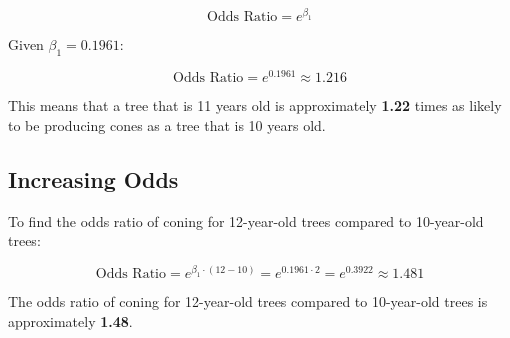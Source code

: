 \documentclass{article}
\begin{document}
\[
\text{Odds Ratio} = e^{\beta_1}
\]

Given \(\beta_1 = 0.1961\):

\[
\text{Odds Ratio} = e^{0.1961} \approx 1.216
\]

This means that a tree that is 11 years old is approximately \textbf{1.22} times as likely to be producing cones as a tree that is 10 years old.

\subsection{Increasing Odds}

To find the odds ratio of coning for 12-year-old trees compared to 10-year-old trees:

\[
\text{Odds Ratio} = e^{\beta_1 \cdot (12 - 10)} = e^{0.1961 \cdot 2} = e^{0.3922} \approx 1.481
\]

The odds ratio of coning for 12-year-old trees compared to 10-year-old trees is approximately \textbf{1.48}.
\end{document}
